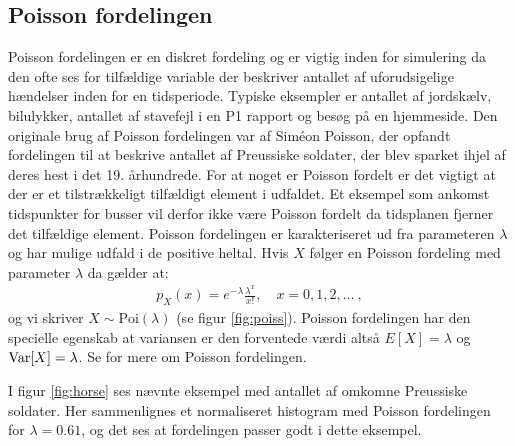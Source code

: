\subsection{Poisson fordelingen}
Poisson fordelingen er en diskret fordeling og er vigtig inden for simulering da den ofte ses for tilfældige variable der beskriver antallet af uforudsigelige hændelser inden for en tidsperiode. Typiske eksempler er antallet af jordskælv, bilulykker, antallet af stavefejl i en P1 rapport og besøg på en hjemmeside. Den originale brug af Poisson fordelingen var af Siméon Poisson, der opfandt fordelingen til at beskrive antallet af Preussiske soldater, der blev sparket ihjel af deres hest i det 19. århundrede. For at noget er Poisson fordelt er det vigtigt at der er et tilstrækkeligt tilfældigt element i udfaldet. Et eksempel som ankomst tidspunkter for busser vil derfor ikke være Poisson fordelt da tidsplanen fjerner det tilfældige element. Poisson fordelingen er karakteriseret ud fra parameteren $\lambda$ og har mulige udfald i de positive heltal. Hvis $X$ følger en Poisson fordeling med parameter $\lambda$ da gælder at:
\begin{align*}
p_X(x) = e^{-\lambda}\frac{\lambda^x}{x!}, \quad x = 0,1,2,\dots \ ,
\end{align*}
og vi skriver $X \sim \text{Poi}(\lambda)$ (se figur \ref{fig:poiss}). Poisson fordelingen har den specielle egenskab at variansen er den forventede værdi altså $E[X] = \lambda$ og $\operatorname{Var}[X] = \lambda$. Se \cite[117-120]{olofsson2012} for mere om Poisson fordelingen. 
\begin{example}
I figur \ref{fig:horse} ses nævnte eksempel med antallet af omkomne Preussiske soldater. Her sammenlignes et normaliseret histogram med Poisson fordelingen for $\lambda = 0.61$, og det ses at fordelingen passer godt i dette eksempel. 
\end{example}
